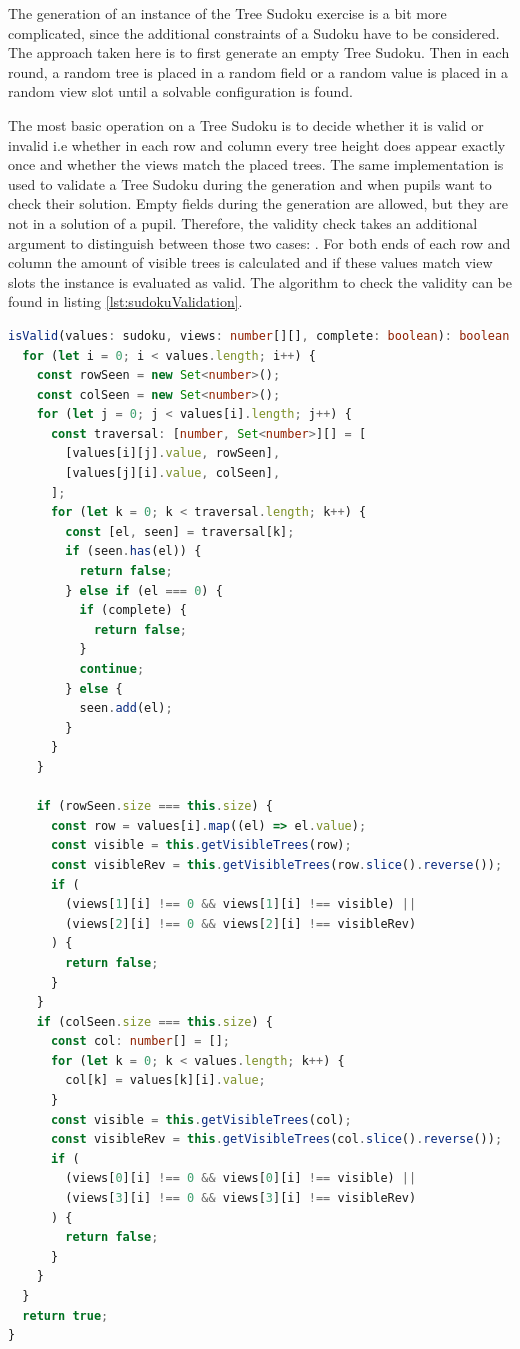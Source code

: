 The generation of an instance of the Tree Sudoku exercise is a bit more complicated, since the additional constraints of a Sudoku have to be considered. The approach taken here is to first generate an empty Tree Sudoku. Then in each round, a random tree is placed in a random field or a random value is placed in a random view slot until a solvable configuration is found. 

The most basic operation on a Tree Sudoku is to decide whether it is valid or invalid i.e whether in each row and column every tree height does appear exactly once and whether the views match the placed trees.
The same implementation is used to validate a Tree Sudoku during the generation and when pupils want to check their solution. Empty fields during the generation are allowed, but they are not in a solution of a pupil. Therefore, the validity check takes an additional argument to distinguish between those two cases: .
For both ends of each row and column the amount of visible trees is calculated and if these values match view slots the instance is evaluated as valid. The algorithm to check the validity can be found in listing \ref{lst:sudokuValidation}.

\begin{lstlisting}[language=TypeScript,caption={Validation algorithm for a Tree Sudoku instance},label={lst:sudokuValidation}]
isValid(values: sudoku, views: number[][], complete: boolean): boolean {
  for (let i = 0; i < values.length; i++) {
    const rowSeen = new Set<number>();
    const colSeen = new Set<number>();
    for (let j = 0; j < values[i].length; j++) {
      const traversal: [number, Set<number>][] = [
        [values[i][j].value, rowSeen],
        [values[j][i].value, colSeen],
      ];
      for (let k = 0; k < traversal.length; k++) {
        const [el, seen] = traversal[k];
        if (seen.has(el)) {
          return false;
        } else if (el === 0) {
          if (complete) {
            return false;
          }
          continue;
        } else {
          seen.add(el);
        }
      }
    }

    if (rowSeen.size === this.size) {
      const row = values[i].map((el) => el.value);
      const visible = this.getVisibleTrees(row);
      const visibleRev = this.getVisibleTrees(row.slice().reverse());
      if (
        (views[1][i] !== 0 && views[1][i] !== visible) ||
        (views[2][i] !== 0 && views[2][i] !== visibleRev)
      ) {
        return false;
      }
    }
    if (colSeen.size === this.size) {
      const col: number[] = [];
      for (let k = 0; k < values.length; k++) {
        col[k] = values[k][i].value;
      }
      const visible = this.getVisibleTrees(col);
      const visibleRev = this.getVisibleTrees(col.slice().reverse());
      if (
        (views[0][i] !== 0 && views[0][i] !== visible) ||
        (views[3][i] !== 0 && views[3][i] !== visibleRev)
      ) {
        return false;
      }
    }
  }
  return true;
}
\end{lstlisting}

